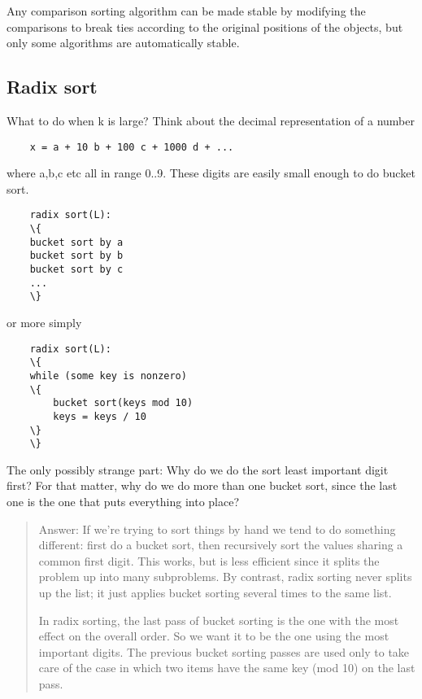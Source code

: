 \documentclass[a4paper,11pt]{article}
\begin{document}
Any comparison sorting algorithm can be made stable by modifying the
comparisons to break ties according to the original positions of the
objects, but only some algorithms are automatically stable.


\subsection{Radix sort}

What to do when k is large? Think about the decimal representation of
a number

\begin{verbatim}
    x = a + 10 b + 100 c + 1000 d + ...
\end{verbatim}

where a,b,c etc all in range 0..9. These digits are easily small
enough to do bucket sort.

\begin{verbatim}
    radix sort(L):
    \{
    bucket sort by a
    bucket sort by b
    bucket sort by c
    ...
    \}
\end{verbatim}

or more simply

\begin{verbatim}
    radix sort(L):
    \{
    while (some key is nonzero)
    \{
        bucket sort(keys mod 10)
        keys = keys / 10
    \}
    \}
\end{verbatim}

The only possibly strange part: Why do we do the sort least important
digit first? For that matter, why do we do more than one bucket sort,
since the last one is the one that puts everything into place?

\begin{quotation}Answer: If we're trying to sort things by hand we
  tend to do something different: first do a bucket sort, then
  recursively sort the values sharing a common first digit. This
  works, but is less efficient since it splits the problem up into
  many subproblems. By contrast, radix sorting never splits up the
  list; it just applies bucket sorting several times to the same list.


  In radix sorting, the last pass of bucket sorting is the one with
  the most effect on the overall order. So we want it to be the one
  using the most important digits. The previous bucket sorting passes
  are used only to take care of the case in which two items have the
  same key (mod 10) on the last pass.
\end{quotation}
\end{document}
